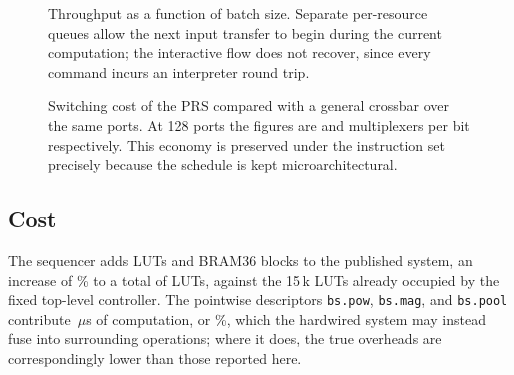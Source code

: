 \documentclass[twocolumn,10pt]{article}
\newcommand{\Pbu}{P_{bu}}
\newcommand{\op}[1]{\texttt{#1}}
\begin{document}
\begin{figure}[t]
\centering
{}
\caption{Throughput as a function of batch size.  Separate per-resource queues
allow the next input transfer to begin during the current computation; the
interactive flow does not recover, since every command incurs an interpreter
round trip.}
\label{fig:batch}
\end{figure}

\begin{figure}[t]
\centering
{}
\caption{Switching cost of the PRS compared with a general crossbar over the
same ports.  At 128 ports the figures are \PrsMuxBig{} and \XbarMuxBig{}
multiplexers per bit respectively.  This economy is preserved under the
instruction set precisely because the schedule is kept microarchitectural.}
\label{fig:prscost}
\end{figure}

\subsection{Cost}
The sequencer adds \SeqLut{} LUTs and \SeqBram{} BRAM36 blocks to the published
system, an increase of \SeqPct\% to a total of \TotLut{} LUTs, against the
15\,k LUTs already occupied by the fixed top-level controller.  The pointwise
descriptors \op{bs.pow}, \op{bs.mag}, and \op{bs.pool} contribute
\GlueUs\,$\mu$s of computation, or \GluePct\%, which the hardwired system may
instead fuse into surrounding operations; where it does, the true overheads are
correspondingly lower than those reported here.
\end{document}
